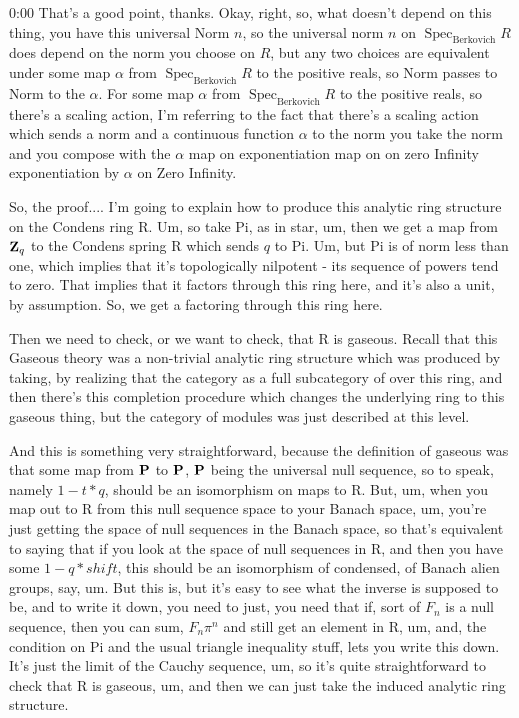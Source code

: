 \begin{unfinished}{0:00}
That's a good point, thanks. Okay, right, so, what doesn't depend on this thing, you have this universal Norm $n$, so the universal norm $n$ on $\operatorname{Spec}_{\mathrm{Berkovich}} R$ does depend on the norm you choose on $R$, but any two choices are equivalent under some map $\alpha$ from $\operatorname{Spec}_{\mathrm{Berkovich}} R$ to the positive reals, so Norm passes to Norm to the $\alpha$. For some map $\alpha$ from $\operatorname{Spec}_{\mathrm{Berkovich}} R$ to the positive reals, so there's a scaling action, I'm referring to the fact that there's a scaling action which sends a norm and a continuous function $\alpha$ to the norm you take the norm and you compose with the $\alpha$ map on exponentiation map on on zero Infinity exponentiation by $\alpha$ on Zero Infinity.

So, the proof.... I'm going to explain how to produce this analytic ring structure on the Condens ring R. Um, so take Pi, as in star, um, then we get a map from $\Z_q$ to the Condens spring R which sends $q$ to Pi. Um, but Pi is of norm less than one, which implies that it's topologically nilpotent - its sequence of powers tend to zero. That implies that it factors through this ring here, and it's also a unit, by assumption. So, we get a factoring through this ring here.

Then we need to check, or we want to check, that R is gaseous. Recall that this Gaseous theory was a non-trivial analytic ring structure which was produced by taking, by realizing that the category as a full subcategory of over this ring, and then there's this completion procedure which changes the underlying ring to this gaseous thing, but the category of modules was just described at this level.

And this is something very straightforward, because the definition of gaseous was that some map from $\P$ to $\P$, $\P$ being the universal null sequence, so to speak, namely $1 - t * q$, should be an isomorphism on maps to R. But, um, when you map out to R from this null sequence space to your Banach space, um, you're just getting the space of null sequences in the Banach space, so that's equivalent to saying that if you look at the space of null sequences in R, and then you have some $1 - q * shift$, this should be an isomorphism of condensed,  of Banach alien groups, say, um. But this is, but it's easy to see what the inverse is supposed to be, and to write it down, you need to just, you need that if, sort of $F_n$ is a null sequence, then you can sum, $F_n \pi^n$ and still get an element in R, um, and, the condition on Pi and the usual triangle inequality stuff, lets you write this down. It's just the limit of the Cauchy sequence, um, so it's quite straightforward to check that R is gaseous, um, and then we can just take the induced analytic ring structure.


\end{unfinished}
